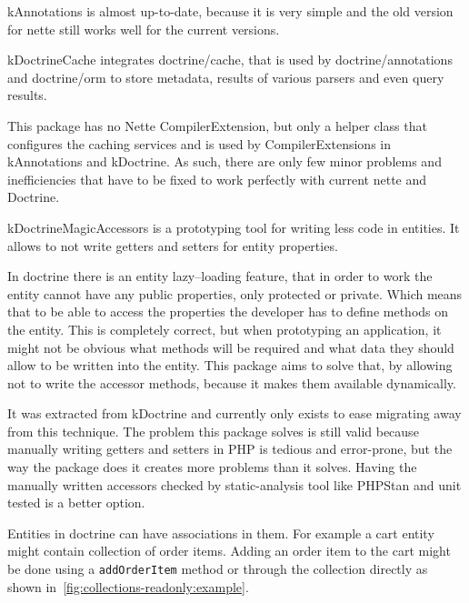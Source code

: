 \gls{kAnnotations} is almost up-to-date, because it is very simple and the old version for \gls{nette} still works well for the current versions.

 \label{sec:state:doctrine-cache}

\gls{kDoctrineCache} integrates doctrine/cache, that is used by doctrine/annotations and doctrine/orm to store metadata, results of various parsers and even query results.

This package has no Nette CompilerExtension, but only a helper class that configures the caching services and is used by CompilerExtensions in \gls{kAnnotations} and \gls{kDoctrine}. As such, there are only few minor problems and inefficiencies that have to be fixed to work perfectly with current \gls{nette} and Doctrine.

 \label{sec:state:doctrine-magic-accessors}

\gls{kDoctrineMagicAccessors} is a prototyping tool for writing less code in entities. It allows to not write getters and setters for entity properties.

In \gls{doctrine} there is an entity lazy--loading feature, that in order to work the entity cannot have any public properties, only protected or private. Which means that to be able to access the properties the developer has to define methods on the entity. This is completely correct, but when prototyping an application, it might not be obvious what methods will be required and what data they should allow to be written into the entity. This package aims to solve that, by allowing not to write the accessor methods, because it makes them available dynamically.

It was extracted from \gls{kDoctrine} and currently only exists to ease migrating away from this technique. The problem this package solves is still valid because manually writing getters and setters in PHP is tedious and error-prone, but the way the package does it creates more problems than it solves. Having the manually written accessors checked by static-analysis tool like PHPStan and unit tested is a better option.

 \label{sec:state:doctrine-collections-readonly}

Entities in \gls{doctrine} can have associations in them. For example a cart entity might contain collection of order items. Adding an order item to the cart might be done using a \lstinline{addOrderItem} method or through the collection directly as shown in~\ref{fig:collections-readonly:example}.

